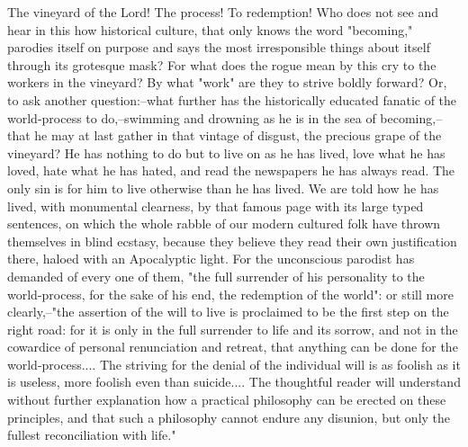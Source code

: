 The vineyard of the Lord! The process! To redemption! Who does not
see and hear in this how historical culture, that only knows the word
"becoming," parodies itself on purpose and says the most
irresponsible things about itself through its grotesque mask? For
what does the rogue mean by this cry to the workers in the vineyard?
By what "work" are they to strive boldly forward? Or, to ask another
question:--what further has the historically educated fanatic of the
world-process to do,--swimming and drowning as he is in the sea of
becoming,--that he may at last gather in that vintage of disgust, the
precious grape of the vineyard? He has nothing to do but to live on
as he has lived, love what he has loved, hate what he has hated, and
read the newspapers he has always read. The only sin is for him to
live otherwise than he has lived. We are told how he has lived, with
monumental clearness, by that famous page with its large typed
sentences, on which the whole rabble of our modern cultured folk have
thrown themselves in blind ecstasy, because they believe they read
their own justification there, haloed with an Apocalyptic light. For
the unconscious parodist has demanded of every one of them, "the full
surrender of his personality to the world-process, for the sake of
his end, the redemption of the world": or still more clearly,--"the
assertion of the will to live is proclaimed to be the first step on
the right road: for it is only in the full surrender to life and its
sorrow, and not in the cowardice of personal renunciation and
retreat, that anything can be done for the world-process.... The
striving for the denial of the individual will is as foolish as it is
useless, more foolish even than suicide.... The thoughtful reader
will understand without further explanation how a practical
philosophy can be erected on these principles, and that such a
philosophy cannot endure any disunion, but only the fullest
reconciliation with life."


